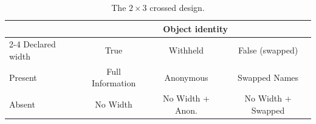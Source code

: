 \begin{table}[H]
\centering
\caption{The $2\times3$ crossed design.}
\label{tab:ex1:grid}
\renewcommand{\arraystretch}{1.4}
\begin{tabular}{lccc}
\toprule
& \multicolumn{3}{c}{Object identity} \\
\cmidrule(l){2-4}
Declared width & True & Withheld & False (swapped) \\
\midrule
Present & Full Information & Anonymous & Swapped Names \\
Absent & No Width & No Width + Anon. & No Width + Swapped \\
\bottomrule
\end{tabular}
\end{table}
